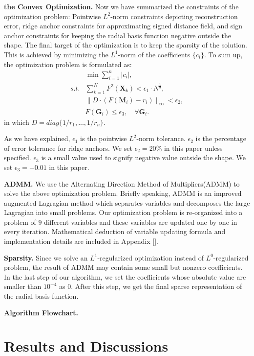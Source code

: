 \documentclass[annual]{acmsiggraph}
\begin{document}
\textbf{the Convex Optimization. } Now we have summarized the constraints of the optimization problem: Pointwise $L^2$-norm constraints depicting reconstruction error, ridge anchor constraints for approximating signed distance field, and sign anchor constraints for keeping the radial basis function negative outside the shape. The final target of the optimization is to keep the sparsity of the solution. This is achieved by minimizing the $L^1$-norm of the coefficients $\{c_i\}$. To sum up, the optimization problem is formulated as:
\begin{align}
&\min\sum_{i=1}^n|c_i|,\\
s.t. &\sum_{k=1}^N F^2(\mathbf{X}_k)<\epsilon_1\cdot N^{\frac{1}{2}},\\
&\|D\cdot(F(\mathbf{M}_i)-r_i)\|_{\infty}<\epsilon_2,\\
& F(\mathbf{G}_i) \le \epsilon_3, \quad\forall \mathbf{G}_i.
\end{align}
in which $D=diag\{1/r_1,...,1/r_n\}$.

As we have explained, $\epsilon_1$ is the pointwise $L^2$-norm tolerance. $\epsilon_2$ is the percentage of error tolerance for ridge anchors. We set $\epsilon_2=20\%$ in this paper unless specified. $\epsilon_3$ is a small value used to signify negative value outside the shape. We set $\epsilon_3=-0.01$ in this paper.

\textbf{ADMM. }
We use the Alternating Direction Method of Multipliers(ADMM) to solve the above optimization problem. Briefly speaking, ADMM is an improved augmented Lagragian method which separates variables and decomposes the large Lagragian into small problems. Our optimization problem is re-organized into a problem of 9 different variables and these variables are updated one by one in every iteration. Mathematical deduction of variable updating formula and implementation details are included in Appendix [].

\textbf{Sparsity. }
Since we solve an $L^1$-regularized optimization instead of $L^0$-regularized problem, the result of ADMM may contain some small but nonzero coefficients. In the last step of our algorithm, we set the coefficients whose absolute value are smaller than $10^{-4}$ as 0. After this step, we get the final sparse representation of the radial basis function.

\textbf{Algorithm Flowchart. }


\section{Results and Discussions}
\cite{Chen:2009:ABF}
\end{document}
